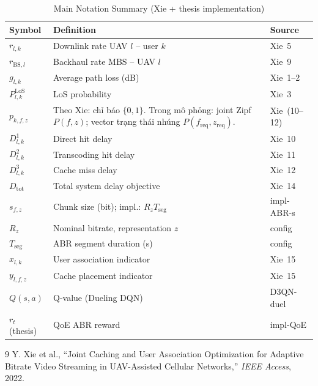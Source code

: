 \documentclass[11pt,a4paper]{article}
\begin{document}
\begin{table}[h!]
\centering
\caption{Main Notation Summary (Xie + thesis implementation)}
\begin{tabular}{@{}p{2.2cm}p{6.8cm}l@{}}
\toprule
Symbol & Definition & Source \\
\midrule
$r_{l,k}$              & Downlink rate UAV $l$ -- user $k$           & Xie~5  \\
$r_{\mathrm{BS},l}$    & Backhaul rate MBS -- UAV $l$                & Xie~9  \\
$g_{l,k}$              & Average path loss (dB)                      & Xie~1--2 \\
$P_{l,k}^{\mathrm{LoS}}$ & LoS probability                           & Xie~3  \\
$p_{k,f,z}$            & Theo Xie: chỉ báo $\{0,1\}$. Trong mô phỏng: joint Zipf $P(f,z)$; vector trạng thái nhúng $P(f_{\mathrm{req}},z_{\mathrm{req}})$. & Xie~(10--12) \\
$D_{l,k}^1$            & Direct hit delay                            & Xie~10 \\
$D_{l,k}^2$            & Transcoding hit delay                       & Xie~11 \\
$D_{l,k}^3$            & Cache miss delay                            & Xie~12 \\
$D_{\mathrm{tot}}$     & Total system delay objective                & Xie~14 \\
$s_{f,z}$              & Chunk size (bit); impl.: $R_z T_{\mathrm{seg}}$ & impl-ABR-s \\
$R_z$                  & Nominal bitrate, representation $z$         & config \\
$T_{\mathrm{seg}}$     & ABR segment duration (s)                    & config \\
$x_{l,k}$              & User association indicator                  & Xie~15 \\
$y_{l,f,z}$            & Cache placement indicator                   & Xie~15 \\
$Q(s,a)$               & Q-value (Dueling DQN)                       & D3QN-duel \\
$r_t$ (thesis)         & QoE ABR reward                             & impl-QoE \\
\bottomrule
\end{tabular}
\end{table}

\begin{thebibliography}{9}
  Y. Xie et al., ``Joint Caching and User Association Optimization for
  Adaptive Bitrate Video Streaming in UAV-Assisted Cellular Networks,''
  \textit{IEEE Access}, 2022.
\end{thebibliography}
\end{document}
